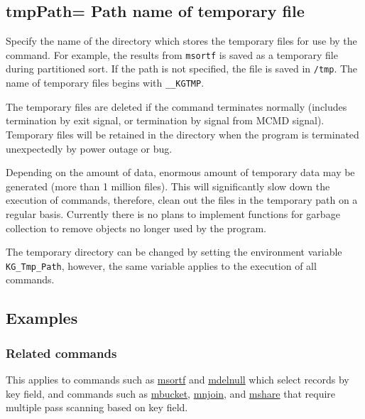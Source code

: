 %

\subsection{tmpPath= Path name of temporary file\label{sect:option_tmpPath}}

Specify the name of the directory which stores the temporary files for use by the command.
For example, the results from \verb|msortf| is saved as a temporary file during partitioned sort. If the path is not specified, the file is saved in \verb|/tmp|. The name of temporary files begins with \verb|__KGTMP|.

The temporary files are deleted if the command terminates normally (includes termination by exit signal, or termination by signal from MCMD signal). Temporary files will be retained in the directory when the program is terminated unexpectedly by power outage or bug.

Depending on the amount of data, enormous amount of temporary data may be generated (more than 1 million files). This will significantly slow down the execution of commands, therefore, clean out the files in the temporary path on a regular basis. Currently there is no plans to implement functions for garbage collection to remove objects no longer used by the program.

The temporary directory can be changed by setting the environment variable \verb|KG_Tmp_Path|, however, the same variable applies to the execution of all commands. 


\subsection*{Examples}


\subsubsection*{Related commands}
This applies to commands such as \hyperref[sect:msortf]{msortf} and \hyperref[sect:mselstr]{mdelnull} which select records by key field,  and commands such as \hyperref[mbucket]{mbucket}, \hyperref[mnjoin]{mnjoin}, and \hyperref[mshare]{mshare} that require multiple pass scanning based on key field.

%

